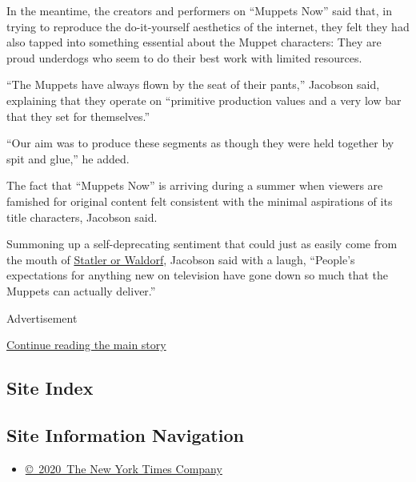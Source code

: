 In the meantime, the creators and performers on ``Muppets Now'' said
that, in trying to reproduce the do-it-yourself aesthetics of the
internet, they felt they had also tapped into something essential about
the Muppet characters: They are proud underdogs who seem to do their
best work with limited resources.

``The Muppets have always flown by the seat of their pants,'' Jacobson
said, explaining that they operate on ``primitive production values and
a very low bar that they set for themselves.''

``Our aim was to produce these segments as though they were held
together by spit and glue,'' he added.

The fact that ``Muppets Now'' is arriving during a summer when viewers
are famished for original content felt consistent with the minimal
aspirations of its title characters, Jacobson said.

Summoning up a self-deprecating sentiment that could just as easily come
from the mouth of
\href{https://www.youtube.com/watch?v=14njUwJUg1I}{Statler or Waldorf},
Jacobson said with a laugh, ``People's expectations for anything new on
television have gone down so much that the Muppets can actually
deliver.''

Advertisement

\protect\hyperlink{after-bottom}{Continue reading the main story}

\hypertarget{site-index}{%
\subsection{Site Index}\label{site-index}}

\hypertarget{site-information-navigation}{%
\subsection{Site Information
Navigation}\label{site-information-navigation}}

\begin{itemize}
\tightlist
\item
  \href{https://help.nytimes.com/hc/en-us/articles/115014792127-Copyright-notice}{©~2020~The
  New York Times Company}
\end{itemize}

